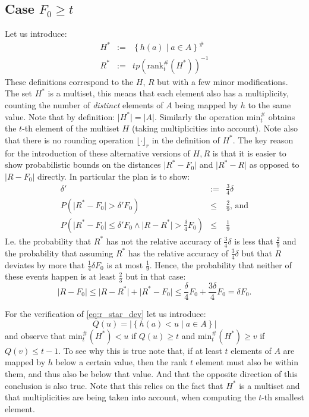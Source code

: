 \documentclass[11pt,a4paper]{article}
\newcommand{\size}[1]{\lvert#1\rvert}
\begin{document}
\subsection{Case $F_0 \geq t$}
Let us introduce:
\begin{eqnarray*}
    H^* & := & \left\{ h(a) \middle \vert a \in A \right\}^{\#} \\
    R^* & := & tp \left( \mathrm{rank}^{\#}_t(H^*) \right)^{-1}
\end{eqnarray*}
These definitions correspond to the $H$, $R$ but with a few minor modifications.
The set $H^*$ is a multiset, this means that each element also has a multiplicity, counting the
number of \emph{distinct} elements of $A$ being mapped by $h$ to the same value.
Note that by definition: $\size{H^*}=\size{A}$.
Similarly the operation $\mathrm{min}^{\#}_t$ obtains the $t$-th element of the multiset $H$
(taking multiplicities into account).
Note also that there is no rounding operation $\lfloor \cdot \rfloor_r$ in the definition of $H^*$.
The key reason for the introduction of these alternative versions of $H, R$ is that it is easier to
show probabilistic bounds on the distances $\size{R^* - F_0}$ and $\size{R^* - R}$ as opposed to 
$\size{R - F_0}$ directly.
In particular the plan is to show:
\begin{eqnarray}
 \delta' & := & \frac{3}{4}\delta \\
 P\left(\size{R^*-F_0} > \delta' F_0\right) & \leq & \frac{2}{9} \textrm{, and} \label{eq:r_star_dev} \\
 P\left(\size{R^*-F_0} \leq \delta' F_0 \wedge \size{R-R^*} > \frac{\delta}{4} F_0\right) & \leq & \frac{1}{9} \label{eq:r_star_r}
\end{eqnarray}
I.e. the probability that $R^*$ has not the relative accuracy of $\frac{3}{4}\delta$ is less that $\frac{2}{9}$ and the probability 
that assuming $R^*$ has the relative accuracy of $\frac{3}{4}\delta$ but that $R$ deviates by more that $\frac{1}{4}\delta F_0$ is at most $\frac{1}{9}$.
Hence, the probability that neither of these events happen is at least $\frac{2}{3}$ but in that case:
\begin{equation}
    \label{eq:concl}
    \size{R-F_0} \leq \size{R - R^*} + \size{R^*-F_0} \leq \frac{\delta}{4} F_0 + \frac{3 \delta}{4} F_0 = \delta F_0 \textrm{.}
\end{equation}

For the verification of \autoref{eq:r_star_dev} let us introduce:
\[
    Q(u) = \size{\left\{h(a) < u \mid a \in A \right\}}
\]
and observe that $\mathrm{min}_t^{\#}(H^*) < u$ if $Q(u) \geq t$ and $\mathrm{min}_t^{\#}(H^*) \geq v$ if $Q(v) \leq t-1$.
To see why this is true note that, if at least $t$ elements of $A$ are mapped by $h$ below a certain value, then the rank $t$ element must also be within them, and thus also be below that value.
And that the opposite direction of this conclusion is also true.
Note that this relies on the fact that $H^*$ is a multiset and that multiplicities are being taken into account, when computing the $t$-th smallest element. 
\end{document}
